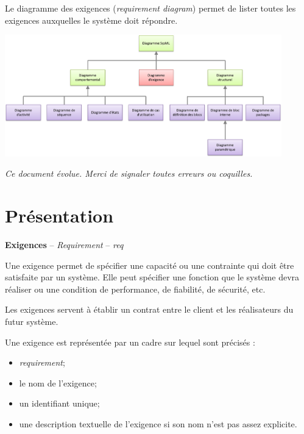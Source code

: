 \documentclass[11pt,oneside]{article}
\begin{document}
Le diagramme des exigences (\textit{requirement diagram}) permet de lister toutes les exigences auxquelles le système doit répondre.

\begin{center}
\includegraphics[width=0.9\textwidth]{png/diagrammes}
\end{center}


\setlength{\parskip}{0ex plus 0.2ex minus 0ex}
 \renewcommand{\contentsname}{}
 \renewcommand{\baselinestretch}{1}

\tableofcontents

 \renewcommand{\baselinestretch}{1.2}
\setlength{\parskip}{2ex plus 0.5ex minus 0.2ex}

\textit{Ce document évolue. Merci de signaler toutes erreurs ou coquilles.}

\section{Présentation}

\begin{defi}
\textbf{Exigences} --  \textit{Requirement} -- \textit{req} \cite{roques}

Une exigence permet de spécifier une capacité ou une contrainte qui doit être satisfaite par un système.
Elle peut spécifier une fonction que le système devra réaliser ou une condition de performance,
de fiabilité, de sécurité, etc.

Les exigences servent à établir un contrat entre le client et les réalisateurs du futur système.


Une exigence est représentée par un cadre sur lequel sont précisés :
\begin{itemize}
\item \textit{requirement};
\item le nom de l'exigence;
\item un identifiant unique;
\item une description textuelle de l'exigence si son nom n'est pas assez explicite.
\end{itemize}
\end{defi}
\end{document}
